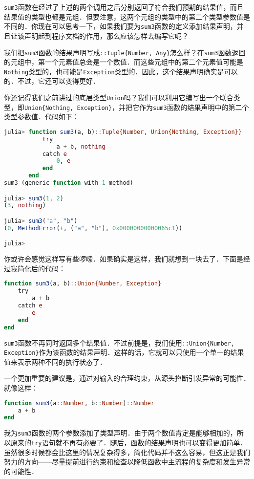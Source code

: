 \verb|sum3|函数在经过了上述的两个调用之后分别返回了符合我们预期的结果值，而且结果值的类型也都是元组．但要注意，这两个元组的类型中的第二个类型参数值是不同的．你现在可以思考一下，如果我们要为\verb|sum3|函数的定义添加结果声明，并且让该声明起到程序文档的作用，那么应该怎样去编写它呢？

我们把\verb|sum3|函数的结果声明写成\verb|::Tuple{Number, Any}|怎么样？在\verb|sum3|函数返回的元组中，第一个元素值总会是一个数值．而这些元组中的第二个元素值可能是\verb|Nothing|类型的，也可能是\verb|Exception|类型的．因此，这个结果声明确实是可以的．不过，它还可以变得更好．

你还记得我们之前讲过的底层类型\verb|Union|吗？我们可以利用它编写出一个联合类型，即\verb|Union{Nothing, Exception}|，并把它作为\verb|sum3|函数的结果声明中的第二个类型参数值．代码如下：

\begin{lstlisting}[language=julia]
julia> function sum3(a, b)::Tuple{Number, Union{Nothing, Exception}}
           try
               a + b, nothing
           catch e
               0, e
           end
       end
sum3 (generic function with 1 method)

julia> sum3(1, 2)
(3, nothing)

julia> sum3("a", "b")
(0, MethodError(+, ("a", "b"), 0x00000000000065c1))

julia> 
\end{lstlisting}

你或许会感觉这样写有些啰嗦．如果确实是这样，我们就想到一块去了．下面是经过我简化后的代码：

\begin{lstlisting}[language=julia]
function sum3(a, b)::Union{Number, Exception}
    try
        a + b
    catch e
        e
    end
end
\end{lstlisting}

\verb|sum3|函数不再同时返回多个结果值．不过前提是，我们使用\verb|::Union{Number, Exception}|作为该函数的结果声明．这样的话，它就可以只使用一个单一的结果值来表示两种不同的执行状态了．

一个更加重要的建议是，通过对输入的合理约束，从源头掐断引发异常的可能性．就像这样：

\begin{lstlisting}[language=julia]
function sum3(a::Number, b::Number)::Number
    a + b
end
\end{lstlisting}

我为\verb|sum3|函数的两个参数添加了类型声明．由于两个数值肯定是能够相加的，所以原来的\verb|try|语句就不再有必要了．随后，函数的结果声明也可以变得更加简单．虽然很多时候都会比这里的情况复杂得多，简化代码并不这么容易，但这正是我们努力的方向——尽量提前进行约束和检查以降低函数中主流程的复杂度和发生异常的可能性．

